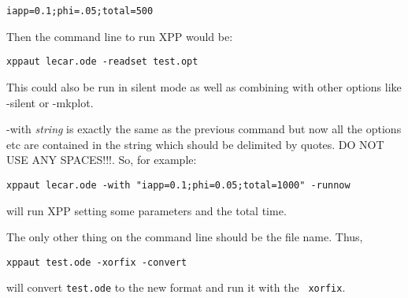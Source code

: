 \begin{description}
\begin{verbatim}
iapp=0.1;phi=.05;total=500
\end{verbatim} 
Then the command line to run XPP would be:
\begin{verbatim}
xppaut lecar.ode -readset test.opt
\end{verbatim}
This could also be run in silent mode as well as combining with other options like -silent or -mkplot.
\item {-with \emph{string}} is exactly the same as the previous command but now all the options etc are contained in the string which should be delimited by quotes. DO NOT USE ANY SPACES!!!.  So, for example:
\begin{verbatim}
xppaut lecar.ode -with "iapp=0.1;phi=0.05;total=1000" -runnow
\end{verbatim}
will run XPP setting some parameters and the total time.  
\end{description}
The only other thing on the command line should be the file name.  
Thus, 
\begin{verbatim}
xppaut test.ode -xorfix -convert
\end{verbatim}
will convert {\tt test.ode} to the new format and run it with the {\tt
xorfix}.














